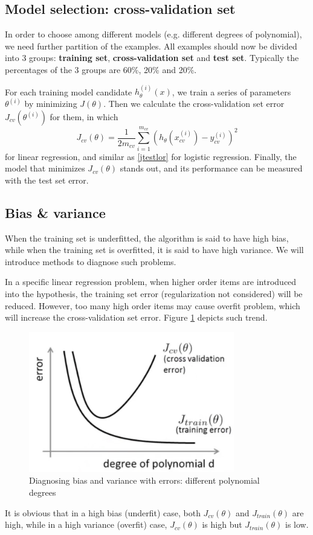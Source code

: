 \subsection{Model selection: cross-validation set}
In order to choose among different models (e.g. different degrees of polynomial), we need further partition of the examples. All examples should now be divided into 3 groups: {\bf training set}, {\bf cross-validation set} and {\bf test set}. Typically the percentages of the 3 groups are 60\%, 20\% and 20\%. 

For each training model candidate $h_{\theta}^{(i)}(x)$, we train a series of parameters $\theta^{(i)}$ by minimizing $J(\theta)$. Then we calculate the cross-validation set error $J_{cv}(\theta^{(i)})$ for them, in which 
$$J_{cv}(\theta) = \frac{1}{2m_{cv}}\sum\limits_{i=1}^{m_{cv}}(h_{\theta}(x^{(i)}_{cv}) - y^{(i)}_{cv})^2$$
for linear regression, and similar as \eqref{jtestlor} for logistic regression. Finally, the model that minimizes $J_{cv}(\theta)$ stands out, and its performance can be measured with the test set error.
\subsection{Bias \& variance}
When the training set is underfitted, the algorithm is said to have high bias, while when the training set is overfitted, it is said to have high variance. We will introduce methods to diagnose such problems.

In a specific linear regression problem, when higher order items are introduced into the hypothesis, the training set error (regularization not considered) will be reduced. However, too many high order items may cause overfit problem, which will increase the cross-validation set error. Figure \ref{biasvariance} depicts such trend.
\begin{figure}[H]
\centering
\includegraphics[width = 0.8\textwidth]{biasvariance.jpg}
\caption{Diagnosing bias and variance with errors: different polynomial degrees}\label{biasvariance}
\end{figure}
It is obvious that in a high bias (underfit) case, both $J_{cv}(\theta)$ and $J_{train}(\theta)$ are high, while in a high variance (overfit) case, $J_{cv}(\theta)$ is high but $J_{train}(\theta)$ is low.


